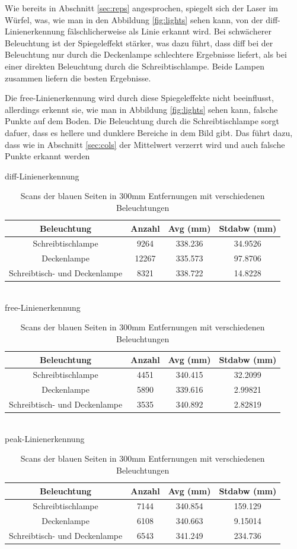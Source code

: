 \documentclass[ngerman,a4paper,parskip=half]{scrartcl}
\begin{document}
Wie bereits in Abschnitt \ref{sec:reps} angesprochen, spiegelt sich der Laser im Würfel, was, wie man in den Abbildung \ref{fig:lights} sehen kann, von der diff-Linienerkennung fälschlicherweise als Linie erkannt wird. Bei schwächerer Beleuchtung ist der Spiegeleffekt stärker, was dazu führt, dass diff bei der Beleuchtung nur durch die Deckenlampe schlechtere Ergebnisse liefert, als bei einer direkten Beleuchtung durch die Schreibtischlampe. Beide Lampen zusammen liefern die besten Ergebnisse.

Die free-Linienerkennung wird durch diese Spiegeleffekte nicht beeinflusst, allerdings erkennt sie, wie man in Abbildung \ref{fig:lights} sehen kann, falsche Punkte auf dem Boden. Die Beleuchtung durch die Schreibtischlampe sorgt dafuer, dass es hellere und dunklere Bereiche in dem Bild gibt. Das führt dazu, dass wie in Abschnitt \ref{sec:cols} der Mittelwert verzerrt wird und auch falsche Punkte erkannt werden

\begin{table}[H]
	\centering
	diff-Linienerkennung \\
	\begin{tabular}{c|c|c|c}
		Beleuchtung & Anzahl & Avg (mm) & Stdabw (mm) \\ \hline
		Schreibtischlampe & 9264 & 338.236 & 34.9526 \\
		Deckenlampe & 12267 & 335.573 & 97.8706 \\
		Schreibtisch- und Deckenlampe & 8321 & 338.722 & 14.8228 \\
	\end{tabular} \\
	\vspace{1em}
	free-Linienerkennung \\
		\begin{tabular}{c|c|c|c}
		Beleuchtung & Anzahl & Avg (mm) & Stdabw (mm) \\ \hline
		Schreibtischlampe & 4451 & 340.415 & 32.2099 \\
		Deckenlampe & 5890 & 339.616 & 2.99821 \\
		Schreibtisch- und Deckenlampe & 3535 & 340.892 & 2.82819 \\
	\end{tabular} \\
	\vspace{1em}
	peak-Linienerkennung \\
		\begin{tabular}{c|c|c|c}
		Beleuchtung & Anzahl & Avg (mm) & Stdabw (mm) \\ \hline
		Schreibtischlampe & 7144 & 340.854 & 159.129 \\
		Deckenlampe & 6108 & 340.663 & 9.15014 \\
		Schreibtisch- und Deckenlampe & 6543 & 341.249 & 234.736 \\
	\end{tabular} \\
	\caption{Scans der blauen Seiten in 300mm Entfernungen mit verschiedenen Beleuchtungen}
	\label{tab:lights}
\end{table}
\end{document}
